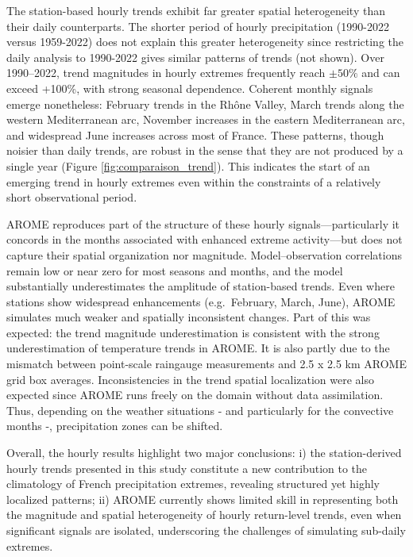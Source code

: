 \documentclass[french,a4paper,DIV=11,numbers=noendperiod]{scrartcl}
\begin{document}
The station-based hourly trends exhibit far greater spatial heterogeneity than their daily counterparts. The shorter period of hourly precipitation (1990-2022 versus 1959-2022) does not explain this greater heterogeneity since restricting the daily analysis to 1990-2022 gives similar patterns of trends (not shown). Over 1990–2022, trend magnitudes in hourly extremes frequently reach $\pm 50\%$ and can exceed +100\%, with strong seasonal dependence. Coherent monthly signals emerge nonetheless: February trends in the Rhône Valley, March trends along the western Mediterranean arc, November increases in the eastern Mediterranean arc, and widespread June increases across most of France. These patterns, though noisier than daily trends, are robust in the sense that they are not produced by a single year (Figure \ref{fig:comparaison_trend}). This indicates the start of an emerging trend in hourly extremes even within the constraints of a relatively short observational period.

AROME reproduces part of the structure of these hourly signals—particularly it concords in the months associated with enhanced extreme activity—but does not capture their spatial organization nor magnitude. Model–observation correlations remain low or near zero for most seasons and months, and the model substantially underestimates the amplitude of station-based trends. Even where stations show widespread enhancements (e.g.\ February, March, June), AROME simulates much weaker and spatially inconsistent changes. Part of this was expected: the trend magnitude underestimation is consistent with the strong underestimation of temperature trends in AROME. It is also partly due to the mismatch between point-scale raingauge measurements and 2.5 x 2.5 km AROME grid box averages. Inconsistencies in the trend spatial localization were also expected since AROME runs freely on the domain without data assimilation. Thus, depending on the weather situations - and particularly for the convective months -, precipitation zones can be shifted. 

Overall, the hourly results highlight two major conclusions: i) the station-derived hourly trends presented in this study constitute a new contribution to the climatology of French precipitation extremes, revealing structured yet highly localized patterns; ii) AROME currently shows limited skill in representing both the magnitude and spatial heterogeneity of hourly return-level trends, even when significant signals are isolated, underscoring the challenges of simulating sub-daily extremes.
\end{document}
